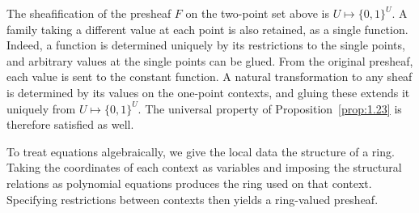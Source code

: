 \begin{example}\label{ex:1.24}

The sheafification of the presheaf $F$ on the two-point set above is
$U\mapsto\{0,1\}^U$.
A family taking a different value at each point is also retained, as a single
function.
Indeed, a function is determined uniquely by its restrictions to the single
points, and arbitrary values at the single points can be glued.
From the original presheaf, each value is sent to the constant function.
A natural transformation to any sheaf is determined by its values on the
one-point contexts, and gluing these extends it uniquely from
$U\mapsto\{0,1\}^U$.
The universal property of Proposition~\ref{prop:1.23} is therefore satisfied as
well.

To treat equations algebraically, we give the local data the structure of a
ring.
Taking the coordinates of each context as variables and imposing the structural
relations as polynomial equations produces the ring used on that context.
Specifying restrictions between contexts then yields a ring-valued presheaf.

\end{example}

